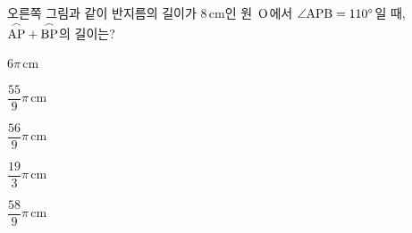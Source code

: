 \noindent\begin{minipage}[t]{0.58\linewidth}\vspace{0pt}\raggedright 오른쪽 그림과 같이 반지름의 길이가 $8\,\mathrm{cm}$인 원~$\mathrm{O}$에서 $\angle\mathrm{APB}=110^\circ$일 때, $\overset{\frown}{\mathrm{AP}}+\overset{\frown}{\mathrm{BP}}$의 길이는?\end{minipage}\hfill\begin{minipage}[t]{0.4\linewidth}\vspace{0pt}\centering \resizebox{\ifdim\width>\linewidth\linewidth\else\width\fi}{!}{}\end{minipage}\par
\begin{choicesii}{\rule[-3ex]{0pt}{8ex}$6\pi\,\mathrm{cm}$}{\rule[-3ex]{0pt}{8ex}$\dfrac{55}{9}\pi\,\mathrm{cm}$}{\rule[-3ex]{0pt}{8ex}$\dfrac{56}{9}\pi\,\mathrm{cm}$}{\rule[-3ex]{0pt}{8ex}$\dfrac{19}{3}\pi\,\mathrm{cm}$}{\rule[-3ex]{0pt}{8ex}$\dfrac{58}{9}\pi\,\mathrm{cm}$}\end{choicesii}
